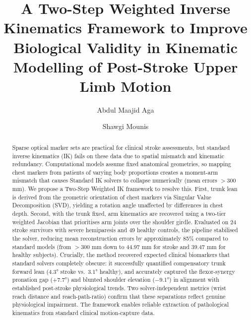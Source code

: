 \documentclass[12pt, a4paper]{elsarticle}
\begin{document}
\onehalfspacing
\linenumbers

\begin{frontmatter}

\title{A Two-Step Weighted Inverse Kinematics Framework to Improve Biological Validity in Kinematic Modelling of Post-Stroke Upper Limb Motion}

\author[hw]{Abdul Maajid Aga}
\author[hw]{Shawgi Mounis}

\address[hw]{Department of Engineering and Physical Sciences, Heriot-Watt University Dubai Campus, Dubai Knowledge Park, PO Box 501745, Dubai, United Arab Emirates}

\begin{abstract}
Sparse optical marker sets are practical for clinical stroke assessments, but standard inverse kinematics (IK) fails on these data due to spatial mismatch and kinematic redundancy. Computational models assume fixed anatomical geometries, so mapping chest markers from patients of varying body proportions creates a moment-arm mismatch that causes Standard IK solvers to collapse numerically (mean errors $>$300 mm). We propose a Two-Step Weighted IK framework to resolve this. First, trunk lean is derived from the geometric orientation of chest markers via Singular Value Decomposition (SVD), yielding a rotation angle unaffected by differences in chest depth. Second, with the trunk fixed, arm kinematics are recovered using a two-tier weighted Jacobian that prioritises arm joints over the shoulder girdle. Evaluated on 24 stroke survivors with severe hemiparesis and 49 healthy controls, the pipeline stabilised the solver, reducing mean reconstruction errors by approximately 85\% compared to standard models (from $>$300 mm down to 44.97 mm for stroke and 39.47 mm for healthy subjects). Crucially, the method recovered expected clinical biomarkers that standard solvers completely obscure: it successfully quantified compensatory trunk forward lean (4.3° stroke vs.\ 3.1° healthy), and accurately captured the flexor-synergy pronation gap ($+$7.7°) and blunted shoulder elevation ($-$9.1°) in alignment with established post-stroke physiological trends. Two solver-independent metrics (wrist reach distance and reach-path-ratio) confirm that these separations reflect genuine physiological impairment. The framework enables reliable extraction of pathological kinematics from standard clinical motion-capture data.
\end{abstract}


\end{frontmatter}
\end{document}
